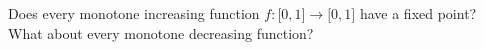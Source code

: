 Does every monotone increasing function $f : \mathbb[0,1] \rightarrow \mathbb[0,1]$ have a fixed point?
What about every monotone decreasing function?